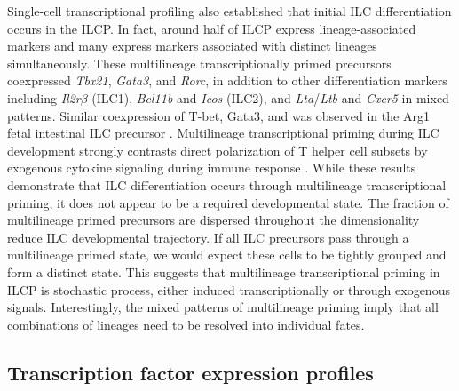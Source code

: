 Single-cell transcriptional profiling also established that initial ILC differentiation occurs in the ILCP. In fact, around half of ILCP express lineage-associated markers and many express markers associated with distinct lineages simultaneously. These multilineage transcriptionally primed precursors coexpressed \textit{Tbx21}, \textit{Gata3}, and \textit{Rorc}, in addition to other differentiation markers including \textit{Il2r$\beta$} (ILC1), \textit{Bcl11b} and \textit{Icos} (ILC2), and \textit{Lta}/\textit{Ltb} and \textit{Cxcr5} in mixed patterns. Similar coexpression of T-bet, Gata3, and \RORgt{} was observed in the Arg1\UP{} fetal intestinal ILC precursor \cite{bando2015}. Multilineage transcriptional priming during ILC development strongly contrasts direct polarization of T helper cell subsets by exogenous cytokine signaling during immune response \cite{zhu2010}. While these results demonstrate that ILC differentiation occurs through multilineage transcriptional priming, it does not appear to be a required developmental state. The fraction of multilineage primed precursors are dispersed throughout the dimensionality reduce ILC developmental trajectory. If all ILC precursors pass through a multilineage primed state, we would expect these cells to be tightly grouped and form a distinct state. This suggests that multilineage transcriptional priming in ILCP is stochastic process, either induced transcriptionally or through exogenous signals. Interestingly, the mixed patterns of multilineage priming imply that all combinations of lineages need to be resolved into individual fates. 

\subsection{Transcription factor expression profiles}

